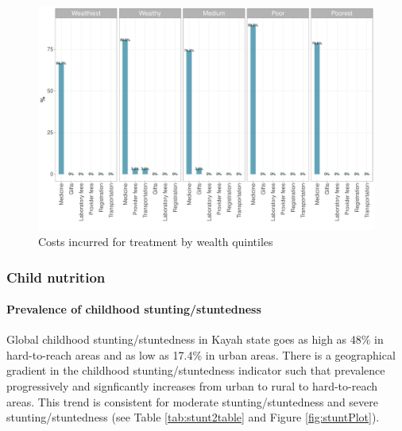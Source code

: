 \documentclass[12pt,a4paper]{article}
\let\oldparagraph\paragraph
\renewcommand{\paragraph}[1]{\oldparagraph{#1}\mbox{}}
\begin{document}
\begin{figure}[H]

{\centering \includegraphics{kayahReport_files/figure-latex/fever8plot-1} 

}

\caption{Costs incurred for treatment by wealth quintiles}\label{fig:fever8plot}
\end{figure}

\hypertarget{cnutrition-resilts}{%
\subsubsection{Child nutrition}\label{cnutrition-resilts}}

\hypertarget{stunting}{%
\paragraph{Prevalence of childhood stunting/stuntedness}\label{stunting}}

Global childhood stunting/stuntedness in Kayah state goes as high as 48\% in hard-to-reach areas and as low as 17.4\% in urban areas. There is a geographical gradient in the childhood stunting/stuntedness indicator such that prevalence progressively and signficantly increases from urban to rural to hard-to-reach areas. This trend is consistent for moderate stunting/stuntedness and severe stunting/stuntedness (see Table \ref{tab:stunt2table} and Figure \ref{fig:stuntPlot}).
\end{document}
